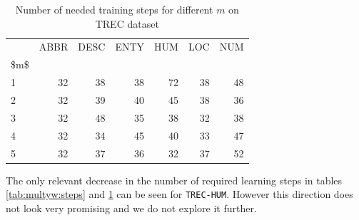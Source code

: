 \begin{table}[H]
\begin{center}

\begin{tabular}{lrrrrrr}
\toprule
{} & ABBR & DESC & ENTY & HUM & LOC & NUM \\
\$m\$ &          &          &          &         &         &         \\
\midrule
1  &        32 &        38 &        38 &        72 &        38 &        48 \\
2  &        32 &        39 &        40 &        45 &        38 &        36 \\
3  &        32 &        48 &        35 &        38 &        32 &        38 \\
4  &        32 &        34 &        45 &        40 &        33 &        47 \\
5  &        32 &        37 &        36 &        32 &        37 &        52 \\
\bottomrule
\end{tabular}

\caption[Number of needed training steps for different $m$ on TREC dataset]{Number of needed training steps for different $m$ on TREC dataset}
\label{tab:multyw:steps:trec}
\end{center}
\end{table}

    The only relevant decrease in the number of required learning steps in tables \ref{tab:multyw:steps} and \ref{tab:multyw:steps:trec} can be seen for \texttt{TREC-HUM}.
    However this direction does not look very promising and we do not explore it further.
    
